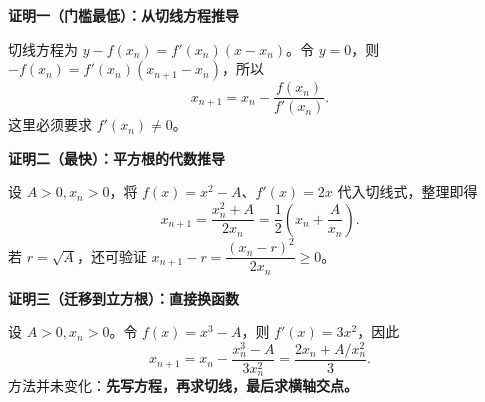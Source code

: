\clearpage
\begin{proofbox}
\textbf{\textcolor{CProof}{证明一（门槛最低）：从切线方程推导}}
\par\medskip
\begin{center}

\end{center}
\medskip
切线方程为 $y-f(x_n)=f'(x_n)(x-x_n)$。令 $y=0$，则 $-f(x_n)=f'(x_n)(x_{n+1}-x_n)$，所以\[\boxed{x_{n+1}=x_n-\frac{f(x_n)}{f'(x_n)}}.\]这里必须要求 $f'(x_n)\ne0$。
\end{proofbox}
\clearpage
\begin{proofbox}
\textbf{\textcolor{CProof}{证明二（最快）：平方根的代数推导}}
\par\medskip
\begin{center}

\end{center}
\medskip
设 $A>0,x_n>0$，将 $f(x)=x^2-A$、$f'(x)=2x$ 代入切线式，整理即得\[x_{n+1}=\frac{x_n^2+A}{2x_n}=\frac12\left(x_n+\frac A{x_n}\right).\]若 $r=\sqrt A$，还可验证 $x_{n+1}-r=\dfrac{(x_n-r)^2}{2x_n}\ge0$。
\end{proofbox}
\clearpage
\begin{proofbox}
\textbf{\textcolor{CProof}{证明三（迁移到立方根）：直接换函数}}
\par\medskip
\begin{center}

\end{center}
\medskip
设 $A>0,x_n>0$。令 $f(x)=x^3-A$，则 $f'(x)=3x^2$，因此\[x_{n+1}=x_n-\frac{x_n^3-A}{3x_n^2}=\frac{2x_n+A/x_n^2}{3}.\]方法并未变化：\textbf{先写方程，再求切线，最后求横轴交点。}
\end{proofbox}
